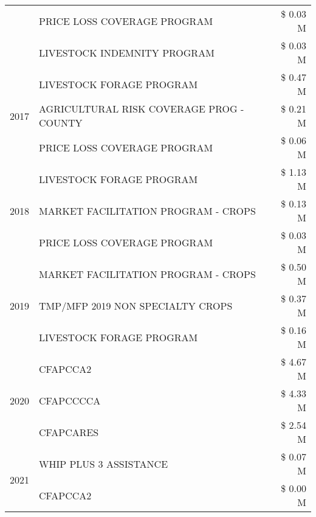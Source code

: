 \begin{tabular}{llr}
 & PRICE LOSS COVERAGE PROGRAM & \$ 0.03 M \\
 & LIVESTOCK INDEMNITY PROGRAM & \$ 0.03 M \\
\cline{1-3}
\multirow[t]{3}{*}{2017} & LIVESTOCK FORAGE PROGRAM & \$ 0.47 M \\
 & AGRICULTURAL RISK COVERAGE PROG - COUNTY & \$ 0.21 M \\
 & PRICE LOSS COVERAGE PROGRAM & \$ 0.06 M \\
\cline{1-3}
\multirow[t]{3}{*}{2018} & LIVESTOCK FORAGE PROGRAM & \$ 1.13 M \\
 & MARKET FACILITATION PROGRAM - CROPS & \$ 0.13 M \\
 & PRICE LOSS COVERAGE PROGRAM & \$ 0.03 M \\
\cline{1-3}
\multirow[t]{3}{*}{2019} & MARKET FACILITATION PROGRAM - CROPS & \$ 0.50 M \\
 & TMP/MFP 2019 NON SPECIALTY CROPS & \$ 0.37 M \\
 & LIVESTOCK FORAGE PROGRAM & \$ 0.16 M \\
\cline{1-3}
\multirow[t]{3}{*}{2020} & CFAPCCA2 & \$ 4.67 M \\
 & CFAPCCCCA & \$ 4.33 M \\
 & CFAPCARES & \$ 2.54 M \\
\cline{1-3}
\multirow[t]{2}{*}{2021} & WHIP PLUS 3 ASSISTANCE & \$ 0.07 M \\
 & CFAPCCA2 & \$ 0.00 M \\
\cline{1-3}
\bottomrule
\end{tabular}
